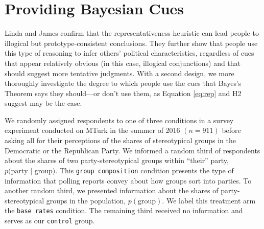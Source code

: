 \documentclass[12pt, letterpaper]{article}
\begin{document}


\section{Providing Bayesian Cues}

Linda and James confirm that the representativeness heuristic can lead people to illogical but prototype-consistent conclusions. They further show that people use this type of reasoning to infer others' political characteristics, regardless of cues that appear relatively obvious (in this case, illogical conjunctions) and that should suggest more tentative judgments. With a second design, we more thoroughly investigate the degree to which people use the cues that Bayes's Theorem says they should---or don't use them, as Equation \ref{eq:rep} and H2 suggest may be the case.

We randomly assigned respondents to one of three conditions in a survey experiment conducted on MTurk in the summer of 2016 $(n=911)$ before asking all for their perceptions of the shares of stereotypical groups in the Democratic or the Republican Party. We informed a random third of respondents about the shares of two party-stereotypical groups within ``their'' party, $p\text{(party | group)}$. This {\tt group composition} condition presents the type of information that polling reports convey about how groups sort into parties. To another random third, we presented information about the shares of party-stereotypical groups in the population, $p(\text{group})$. We label this treatment arm the {\tt base rates} condition. The remaining third received no information and serves as our {\tt control} group.
\end{document}
